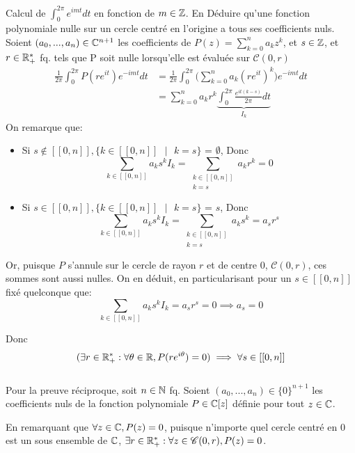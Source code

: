 \documentclass{article}
\renewenvironment{question_kholle}[2][ ]
{
	\subsection{\texorpdfstring{#2}{}}
	\notblank{#1}
	{
		\noindent #1
		\bigbreak
	}
	{}
	\begin{proof}
}
{
	\end{proof}
}
\begin{document}
\begin{question_kholle}{Calcul de $\int_0^{2\pi}e^{imt}dt$ en fonction de $m \in \mathbb Z$. En Déduire qu'une fonction polynomiale nulle sur un cercle centré en l'origine a tous ses coefficients nuls.}
	Soient $(a_0, ..., a_n) \in \mathbb C^{n+1}$ les coefficients de $P(z) = \sum_{k=0}^n a_k z^k$, et $s\in \mathbb Z$, et $r \in \mathbb R_+^*$ fq. tels que P soit nulle lorsqu'elle est évaluée sur $\mathscr C(0,r)$
	\begin{align*}
		\frac{1}{2 \pi} \int_0^{2\pi} P(re^{it}) e^{-imt}dt &= \frac{1}{2 \pi} \int_0^{2\pi} \bigg (\sum_{k=0}^n a_k (re^{it})^k \bigg) e^{-imt}dt\\
		&= \sum_{k=0}^n a_k r^k \underbrace{\int_0^{2\pi} \frac{e^{it(k-s)}}{2 \pi} dt}_{I_k}
	\end{align*}
	On remarque que:
	\begin{itemize}
		\item Si $s \notin [[0, n]], \{k \in [[0, n]] \text{ }| \text{ } k = s\}$ = $\emptyset$, Donc $$\sum_{k \in [[0, n]]} a_k s^k I_k  = \sum_{\substack{k \in [[0, n]] \\ k = s}} a_k r^k  = 0$$
		\item Si $s \in [[0, n]], \{k \in [[0, n]] \text{ }| \text{ } k = s\}$ = ${s}$, Donc $$\sum_{k \in [[0, n]]} a_k s^k I_k = \sum_{\substack{k \in [[0, n]] \\ k = s}} a_k s^k = a_s r^s \label{1}$$
	\end{itemize}
	Or, puisque $P$ s'annule sur le cercle de rayon $r$ et de centre $0$,  $\mathscr C(0,r)$, ces sommes sont aussi nulles. On en déduit, en particularisant pour un $s \in [[0, n]]$ fixé quelconque que:
	$$
		\sum_{k \in [[0, n]]} a_k s^k I_k = a_sr^s = 0 \implies a_s = 0
	$$
	
	Donc $$
		(\exists r \in \mathbb R_+^* : \forall \theta \in \mathbb R, P(re^{i\theta})=0) \implies \forall s \in [[0, n]]
	$$
	\\
	Pour la preuve réciproque,  soit $n \in \mathbb N$ fq. Soient $(a_0,...,a_n) \in \{ 0 \} ^{n+1}$ les coefficients nuls de la fonction polynomiale $P \in \mathbb C[z]$ définie pour tout $z \in \mathbb C$.
	
	En remarquant que $\forall z \in \mathbb C , P(z) = 0$, puisque n'importe quel cercle centré en 0 est un sous ensemble de $\mathbb C$,  $\exists r \in \mathbb R_+^*: \forall z \in \mathscr C(0, r), P(z) = 0$.
\end{question_kholle}
\end{document}
